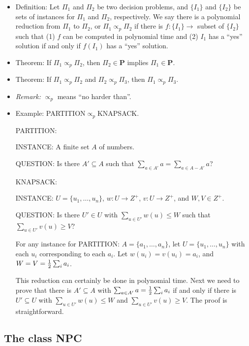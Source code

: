 \documentclass{article}
\begin{document}
\begin{itemize}

\item Definition: Let $\Pi_1$ and $\Pi_2$ be two decision problems,
and $\{I_1\}$ and $\{I_2\}$ be sets of instances for $\Pi_1$ and
$\Pi_2$, respectively. We say there is a polynomial reduction
from $\Pi_1$ to $\Pi_2$, or $\Pi_1\propto_p\Pi_2$ if there is
$f:\{I_1\}\rightarrow$ subset of $\{I_2\}$ such that (1)
$f$ can be computed in polynomial time and (2) $I_1$ has a 
``yes'' solution if and only if $f(I_1)$ has a ``yes''
solution. 

\item Theorem: If $\Pi_1\propto_p\Pi_2$, then $\Pi_2\in${\bf P}
implies $\Pi_1\in${\bf P}.

\item Theorem: If $\Pi_1\propto_p\Pi_2$ and $\Pi_2\propto_p\Pi_3$,
then $\Pi_1\propto_p\Pi_3$.

\item {\em Remark:} $\propto_p$ means ``no harder than''.

\item Example: PARTITION$\propto_p$KNAPSACK.

PARTITION:

INSTANCE: A finite set $A$ of numbers.

QUESTION: Is there $A'\subseteq A$ such that $\sum_{a\in A'}a=
\sum_{a\in A-A'}a$?

KNAPSACK:

INSTANCE: $U=\{u_1,\ldots,u_n\}$, $w:U\rightarrow Z^+$,
$v:U\rightarrow Z^+$, and $W,V\in Z^+$.

QUESTION: Is there $U'\in U$ with $\sum_{u\in U'}w(u)\le W$
such that $\sum_{u\in U'}v(u)\ge V$?

For any instance for PARTITION: $A=\{a_1,\ldots,a_n\}$,
let $U=\{u_1,\ldots,u_n\}$ with each $u_i$ corresponding to
each $a_i$. Let $w(u_i)=v(u_i)=a_i$, and $W=V={1\over2}\sum_i a_i$.

This reduction can certainly be done in polynomial time. Next we
need to prove that there is $A'\subseteq A$ with $\sum_{a\in A'}a
={1\over2}\sum_i a_i$ if and only if there is $U'\subseteq U$
with $\sum_{u\in U'}w(u)\le W$ and $\sum_{u\in U'}v(u)\ge V$.
The proof is straightforward.

\end{itemize}

\subsection{The class {\bf NPC}}
\end{document}
